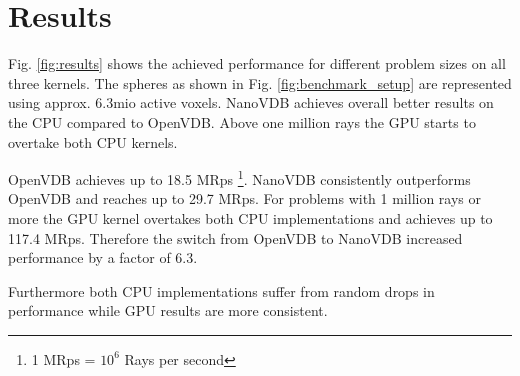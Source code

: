 \section{Results}

Fig. \ref{fig:results} shows the achieved performance for different problem sizes on all three kernels.
The spheres as shown in Fig. \ref{fig:benchmark_setup} are represented using approx. 6.3mio active voxels.
NanoVDB achieves overall better results on the CPU compared to OpenVDB.
Above one million rays the GPU starts to overtake both CPU kernels.

OpenVDB achieves up to 18.5 MRps \footnote{1 MRps = $10^6$ Rays per second}. NanoVDB consistently outperforms OpenVDB and reaches up to 29.7 MRps.
For problems with 1 million rays or more the GPU kernel overtakes both CPU implementations and achieves up to 117.4 MRps.
Therefore the switch from OpenVDB to NanoVDB increased performance by a factor of 6.3.

Furthermore both CPU implementations suffer from random drops in performance while GPU results are more consistent.


